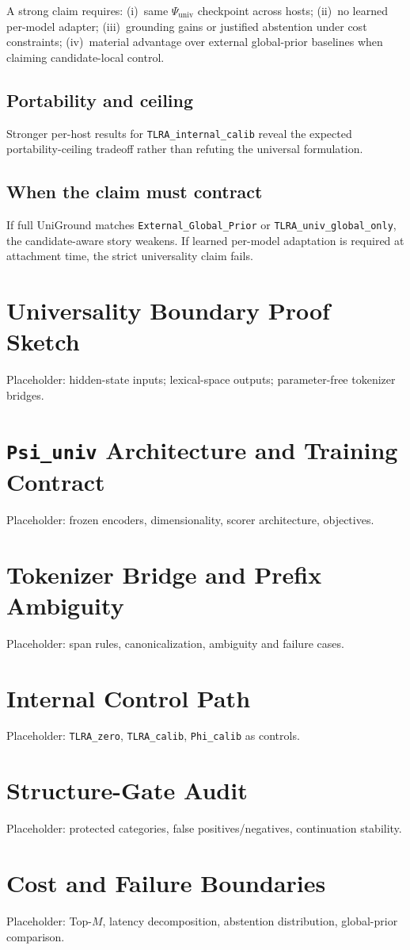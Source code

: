 A strong claim requires: (i)~same $\Psi_{\mathrm{univ}}$ checkpoint across hosts; (ii)~no learned per-model adapter; (iii)~grounding gains or justified abstention under cost constraints; (iv)~material advantage over external global-prior baselines when claiming candidate-local control.

\subsection{Portability and ceiling}

Stronger per-host results for \texttt{TLRA\_internal\_calib} reveal the expected portability-ceiling tradeoff rather than refuting the universal formulation.

\subsection{When the claim must contract}

If full UniGround matches \texttt{External\_Global\_Prior} or \texttt{TLRA\_univ\_global\_only}, the candidate-aware story weakens. If learned per-model adaptation is required at attachment time, the strict universality claim fails.

\appendix

\section{Universality Boundary Proof Sketch}
Placeholder: hidden-state inputs; lexical-space outputs; parameter-free tokenizer bridges.

\section{\texttt{Psi\_univ} Architecture and Training Contract}
Placeholder: frozen encoders, dimensionality, scorer architecture, objectives.

\section{Tokenizer Bridge and Prefix Ambiguity}
Placeholder: span rules, canonicalization, ambiguity and failure cases.

\section{Internal Control Path}
Placeholder: \texttt{TLRA\_zero}, \texttt{TLRA\_calib}, \texttt{Phi\_calib} as controls.

\section{Structure-Gate Audit}
Placeholder: protected categories, false positives/negatives, continuation stability.

\section{Cost and Failure Boundaries}
Placeholder: Top-$M$, latency decomposition, abstention distribution, global-prior comparison.
